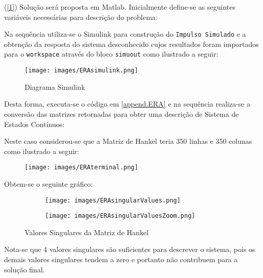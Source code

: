 \documentclass{article}
\begin{document}
    \begin{resolution}
        (\ref{1}) Solução será proposta em Matlab. Inicialmente define-se as seguintes variáveis necessárias para descrição do problema:
        \begin{scriptsize}
            \myOctave
            \myOctave
        \end{scriptsize}
        Na sequência utiliza-se o Simulink para construção do \texttt{Impulso Simulado} e a obtenção da resposta do sistema desconhecido cujos resultados foram importados para o \texttt{workspace} através do bloco \texttt{simuout} como ilustrado a seguir:
        \begin{figure}[H]
            \centering
            \texttt{[image: images/ERAsimulink.png]}
            \caption{Diagrama Simulink}
        \end{figure}
\newpage
        Desta forma, executa-se o código em \ref{append.ERA} e na sequência realiza-se a conversão das matrizes retornadas para obter uma descrição de Sistema de Estados Contínuos:
        \begin{scriptsize}
            \myOctave
        \end{scriptsize}
        Neste caso considerou-se que a Matriz de Hankel teria 350 linhas e 350 colunas como ilustrado a seguir:
        \begin{figure}[H]
            \centering
            \texttt{[image: images/ERAterminal.png]}
        \end{figure}
        Obtem-se o seguinte gráfico:
        \begin{figure}[H]
            \centering
            \begin{subfigure}[H]{0.45\textwidth}
                \centering
                \texttt{[image: images/ERAsingularValues.png]}
            \end{subfigure}
            \begin{subfigure}[H]{0.45\textwidth}
                \centering
                \texttt{[image: images/ERAsingularValuesZoom.png]}
            \end{subfigure}
            \caption{Valores Singulares da Matriz de Hankel}
        \end{figure}
        Nota-se que 4 valores singulares são suficientes para descrever o sistema, pois os demais valores singulares tendem a zero e portanto não contribuem para a solução final.

\end{resolution}
\end{document}

